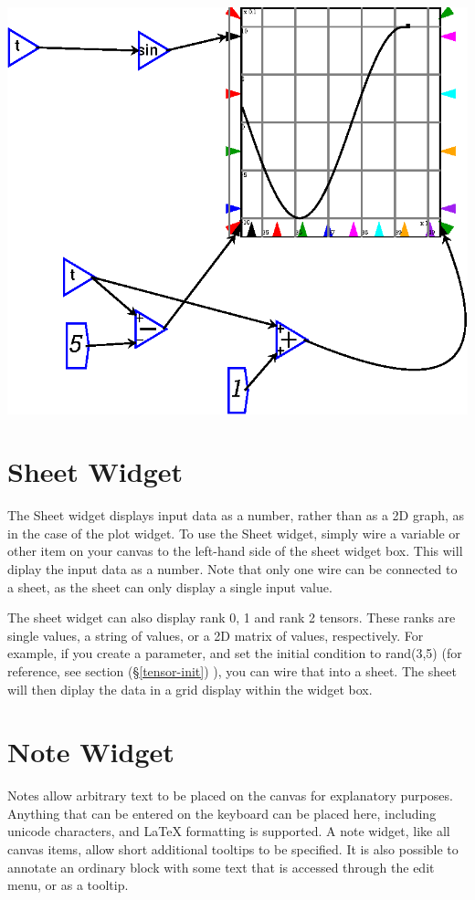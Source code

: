 \begin{description}
\begin{center}
\includegraphics{images/plotSlidingWindow.eps}
\end{center}
\end{description}

\section{Sheet Widget}
 \label{Sheets}\label{Item} The Sheet widget displays input data as a
 number, rather than as a 2D graph, as in the case of the plot widget.
 To use the Sheet widget, simply wire a variable or other item on your
 canvas to the left-hand side of the sheet widget box. This will diplay
 the input data as a number. Note that only one wire can be connected to
 a sheet, as the sheet can only display a single input value.
 
 The sheet widget can also display rank 0, 1 and rank 2 tensors. These ranks are
 single values, a string of values, or a 2D matrix of values, respectively.
 For example, if you create a parameter, and set the initial condition to rand(3,5)
 (for reference, see section (\S\ref{tensor-init}) ), you can wire that into a sheet.
 The sheet will then diplay the data in a grid display within the widget box.

\section{Note Widget}
 \label{Notes}\label{Item} Notes allow arbitrary text to be
placed on the canvas for explanatory purposes. Anything that can be
entered on the keyboard can be placed here, including unicode
characters, and LaTeX formatting is supported. A note
widget, like all canvas items, allow short additional tooltips to be
specified. It is also possible to annotate an ordinary block with some text
that is accessed through the edit menu, or as a tooltip.

